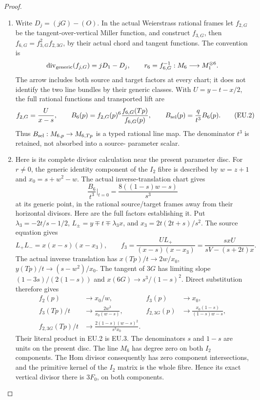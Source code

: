 \begin{proof}
\begin{enumerate}[label=\arabic*.]
\par

\medskip\noindent\textbf{EU.2. The complete rational Cartier multiplier at the collision}

\par\nobreak

\item Write \(D_j=(jG)-(O)\). In the actual Weierstrass rational frames let
\(f_{2,G}\) be the tangent-over-vertical Miller function, and construct
\(f_{3,G}\), then \(f_{6,G}=f_{3,G}^2f_{2,3G}\), by their actual chord
and tangent functions. The convention is
\[
 \operatorname{div}_{\rm generic}(f_{j,G})=jD_1-D_j,
 \qquad r_6=f_{6,G}^{-1}:M_6\longrightarrow M_1^{\otimes6}.
\]
The arrow includes both source and target factors at every chart; it
does not identify the two line bundles by their generic classes. With
\(U=y-t-x/2\), the full rational functions and transported lift are
\[
 f_{2,G}=\frac{U}{x-s},\qquad
 B_6(p)=f_{2,G}(p)^6\frac{f_{6,G}(Tp)}{f_{6,G}(p)},\qquad
 B_{\rm sel}(p)=\frac{q}{t^3}B_6(p).
 \tag{EU.2}
\]
Thus \(B_{\rm sel}:M_{6,p}\to M_{6,Tp}\) is a typed rational line map.
The denominator \(t^3\) is retained, not absorbed into a source-
parameter scalar.

\item Here is its complete divisor calculation near the present parameter
disc. For \(r\ne0\), the generic identity component of the \(I_2\)
fibre is described by \(w=z+1\) and
\(x_0=s+w^2-w\). The actual inverse-translation chart gives
\[
 \frac{B_6}{t^3}\bigg|_{t=0}
       =\frac{8((1-s)w-s)}{s^3}
 \tag{EU.3}
\]
at its generic point, in the rational source/target frames away from
their horizontal divisors. Here are the full factors establishing it.
Put \(\lambda_3=-2t/s-1/2\),
\(L_\pm=y\mp t\mp\lambda_3x\), and
\(x_3=2t(2t+s)/s^2\). The source equation gives
\[
 L_+L_-=x(x-s)(x-x_3),\qquad
 f_3=\frac{UL_+}{(x-s)(x-x_3)}
     =\frac{s xU}{sV-(s+2t)x}.
\]
The actual inverse translation has
\(x(Tp)/t\to2w/x_0\), \(y(Tp)/t\to(s-w^2)/x_0\).
The tangent of \(3G\) has limiting slope
\((1-3s)/(2(1-s))\) and \(x(6G)\to s^3/(1-s)^2\).
Direct substitution therefore gives
\[
\begin{aligned}
 f_2(p)&\to x_0/w,& f_3(p)&\to x_0,\\
 f_3(Tp)/t&\to\frac{2w^3}{x_0(w-s)},&
 f_{2,3G}(p)&\to\frac{x_0(1-s)}{(1-s)w-s},\\
 f_{2,3G}(Tp)/t&\to
       \frac{2(1-s)(w-s)^2}{s^3x_0}.
\end{aligned}
\]
Their literal product in EU.2 is EU.3. The denominators
\(s\) and \(1-s\) are units on the present disc. The line \(M_6\)
has degree zero on both \(I_2\) components. The Hom divisor consequently
has zero component intersections, and the primitive kernel of the
\(I_2\) matrix is the whole fibre. Hence its exact vertical divisor
there is \(3F_0\), on both components.


\end{enumerate}
\end{proof}
